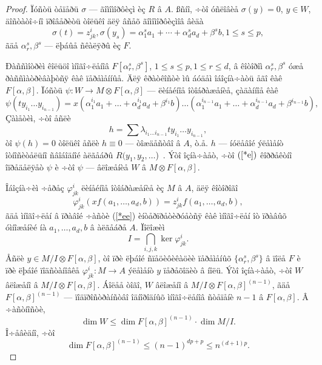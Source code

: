 \documentclass{article}
\numberwithin{equation}{section}
\theoremstyle{plain}
\theoremstyle{definition}
\newtheorem{proof}{Äîêàçàòåëüñòâî}
\begin{document}
\begin{fulltext}
\begin{proof}
Ïóñòü òåïåðü $\sigma$ --- ãîìîìîðôèçì èç $R$ â $A$. ßñíî, ÷òî óñëîâèå $\sigma(y)=0$, $y\in W$,
äîñòàòî÷íî ïðîâåðèòü òîëüêî äëÿ âñåõ ãîìîìîðôèçìîâ âèäà
$$
\sigma(t)= z^i_{jk}, \sigma(y_s)=\alpha_1^sa_1+\cdots+\alpha_d^s a_d+\beta^s b,
1\le s \le p,
$$
ãäå $\alpha_r^s, \beta^s$ --- ëþáûå ñêàëÿðû èç $F$.
 
Ðàññìîòðèì êîëüöî ìíîãî÷ëåíîâ $F[\alpha_r^s, \beta^s]$, $1\le s\le p, 1\le r \le d$, â
êîòîðîì $\alpha_r^s, \beta^s$  óæå ðàññìàòðèâàþòñÿ êàê ïåðåìåííûå. Äëÿ êðàòêîñòè ìû áóäåì
îáîçíà÷àòü åãî êàê $F[\alpha, \beta]$. Ïóñòü $\psi: W\to M\otimes F[\alpha,\beta]$ --- 
ëèíåéíîå îòîáðàæåíèå, çàäàííîå êàê
\begin{equation}\label{*e}
\psi(ty_{i_1}\ldots y_{i_{n-1}})=
x(\alpha_1^{i_1}a_1+\ldots+\alpha_d^{i_1}a_d+\beta^{i_1} b)\ldots
(\alpha_1^{i_{n-1}}a_1+\ldots+\alpha_d^{i_{n-1}}a_d+\beta^{i_{n-1}} b),
\end{equation}
Çàìåòèì, ÷òî åñëè
$$
h=\sum \lambda_{i_1\ldots i_{n-1}}ty_{i_1}\ldots y_{i_{n-1}},
$$
òî $\psi(h)=0$ òîëüêî åñëè $h\equiv 0$ --- òîæäåñòâî â $A$, ò.å. $h$ --- íóëåâîé ýëåìåíò
îòíîñèòåëüíî ñâîáîäíîé àëãåáðû $R(y_1,y_2,\ldots$)~. Ýòî îçíà÷àåò, ÷òî $(\ref{*e})$ êîððåêòíî
 îïðåäåëÿåò $\psi$ è ÷òî $\psi$ --- âëîæåíèå $W$  â $M\otimes F[\alpha,\beta]$.

Îáîçíà÷èì ÷åðåç $\varphi^i_{jk}$ ëèíåéíîå îòîáðàæåíèå èç  $M$ â $A$,  äëÿ êîòîðîãî
\begin{equation}\label{*ee}
\varphi^i_{jk}(xf(a_1,\ldots, a_d,b))=z^i_{jk}f(a_1,\ldots, a_d,b),
\end{equation}
ãäå ìíîãî÷ëåí â ïðàâîé ÷àñòè (\ref{*ee}) èíòåðïðåòèðóåòñÿ êàê ìíîãî÷ëåí îò ïðàâûõ
óìíîæåíèé íà $a_1,\ldots, a_d,b$  â àëãåáðå $A$. Ïîëîæèì
$$
I=\bigcap_{i,j,k} \ker\varphi^i_{jk}.
$$
Åñëè  $y\in M/I\otimes F[\alpha,\beta]$, òî ïðè ëþáîé ñïåöèôèêàöèè ïåðåìåíûõ
$\{\alpha_r^s,\beta^s\}$ â ïîëå $F$ è ïðè ëþáîé ïîäñòàíîâêå $\varphi^i_{jk}: M\to A$
ýëåìåíò $y$ ïåðåõîäèò â íîëü. Ýòî îçíà÷àåò, ÷òî $W$ âëîæåíî â
$M/I\otimes F[\alpha,\beta]$. Áîëåå òîãî, $W$ âëîæåíî â
$M/I\otimes F[\alpha,\beta]^{(n-1)}$, ãäå $F[\alpha,\beta]^{(n-1)}$ --- ïîäïðîñòðàíñòâî
îäíîðîäíûõ ìíîãî÷ëåíîâ ñòåïåíè $n-1$ â $F[\alpha,\beta]$. Â ÷àñòíîñòè,
$$
\dim W \le \dim F[\alpha,\beta]^{(n-1)} \cdot \dim M/I.
$$
Î÷åâèäíî, ÷òî
$$
\dim F[\alpha,\beta]^{(n-1)} \le (n-1)^{dp+p} \le n^{(d+1)p}.
$$


\end{proof}
\end{fulltext}
\end{document}
